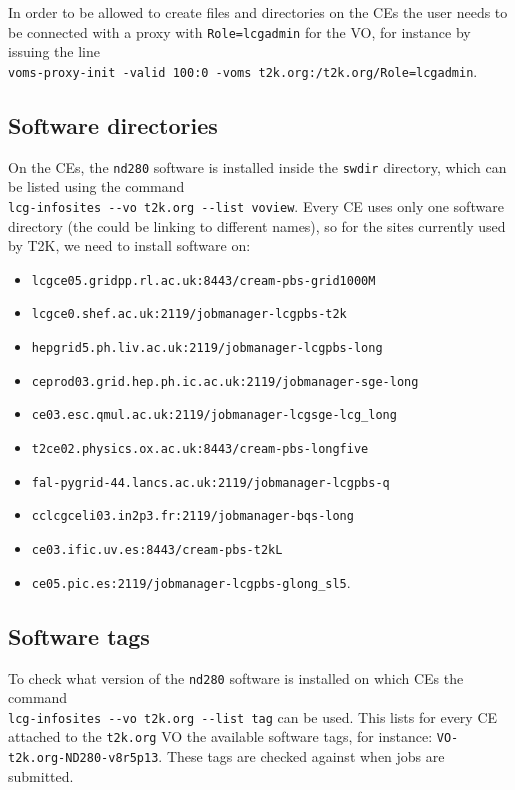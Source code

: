 \documentclass[11pt]{article}
\begin{document}
In order to be allowed to create files and directories on the CEs the
user needs to be connected with a proxy with \verb+Role=lcgadmin+ for
the VO, for instance by issuing the line\\
\verb+voms-proxy-init -valid 100:0 -voms t2k.org:/t2k.org/Role=lcgadmin+.

\subsection{Software directories}
On the CEs, the \verb+nd280+ software is installed inside the \verb+swdir+ directory, which can be listed using the command\\
\verb+lcg-infosites --vo t2k.org --list voview+.
Every CE uses only one software directory (the could be linking to different names), so for the sites currently used by T2K, we need to install software on:

\begin{itemize}
\item \verb+lcgce05.gridpp.rl.ac.uk:8443/cream-pbs-grid1000M+
\item \verb+lcgce0.shef.ac.uk:2119/jobmanager-lcgpbs-t2k+
\item \verb+hepgrid5.ph.liv.ac.uk:2119/jobmanager-lcgpbs-long+
\item \verb+ceprod03.grid.hep.ph.ic.ac.uk:2119/jobmanager-sge-long+
\item \verb+ce03.esc.qmul.ac.uk:2119/jobmanager-lcgsge-lcg_long+
\item \verb+t2ce02.physics.ox.ac.uk:8443/cream-pbs-longfive+
\item \verb+fal-pygrid-44.lancs.ac.uk:2119/jobmanager-lcgpbs-q+
\item \verb+cclcgceli03.in2p3.fr:2119/jobmanager-bqs-long+
\item \verb+ce03.ific.uv.es:8443/cream-pbs-t2kL+
\item \verb+ce05.pic.es:2119/jobmanager-lcgpbs-glong_sl5+.
\end{itemize}

\subsection{Software tags}
To check what version of the \verb+nd280+ software is installed on
which CEs the command\\ \verb+lcg-infosites --vo t2k.org --list tag+ can
be used. This lists for every CE attached to the \verb+t2k.org+ VO the
available software tags, for instance:
\verb+VO-t2k.org-ND280-v8r5p13+. These tags are checked against when
jobs are submitted.
\end{document}
